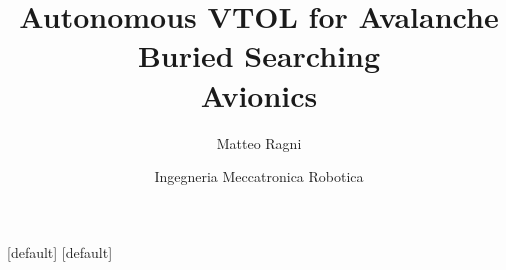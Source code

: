 \usepackage{siunitx}
\usepackage{array}
\usepackage{animate}
\usepackage{graphicx} 

\usepackage[vlined]{algorithm2e}
\newcommand{\commentstyle}[1]{\footnotesize\ttfamily\textcolor{gray}{#1}}
\usepackage{rotating}

\usepackage{tikz}
\usepackage{tikz-3dplot}
\usepackage{pgfplots}
\usetikzlibrary{shapes,arrows,positioning,matrix,decorations.pathreplacing,3d,calc}


\geometry{a5paper,landscape}


[default]
[default]

\title{Autonomous VTOL for Avalanche Buried Searching \\ {\Huge Avionics}}
\author{Matteo Ragni}
\date{Ingegneria Meccatronica Robotica}

\setcounter{tocdepth}{1}

\usepackage{mathpazo}

\newcommand{\transitioneffectcommon}{\transfade[duration=0.25]}

\newcommand{\newslide}[2]{%
\subsection{#1}
\begin{frame}{\hspace{ \stretch{1} }\textbf{\huge#1}\hspace{ \stretch{1} }}
#2
\transitioneffectcommon
\end{frame}%
}

\newcommand{\newslidenn}[2]{%
\subsection*{#1}
\begin{frame}{\hspace{ \stretch{1} }\textbf{\huge#1}\hspace{ \stretch{1} }}
#2
\transitioneffectcommon
\end{frame}%
}

\def\bfield{\mathbf{B}}
\def\afield{\mathbf{A}}
\def\efield{\mathbf{E}}
\def\hfield{\mathbf{H}}
\def\currdens{\mathbf{J}}
\def\dielettrico{\varepsilon_0}
\def\magperm{\mu_0}
\def\partialt{\dfrac{\partial}{\partial t}}
\def\chargedens{\rho}
\renewcommand{\arraystretch}{1.85}

